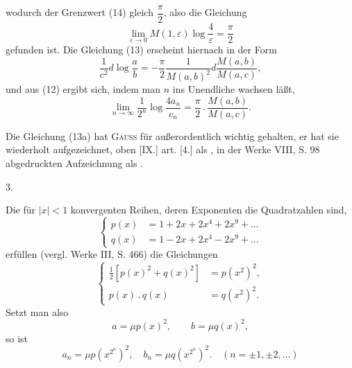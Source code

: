 \noindent wodurch der Grenzwert (14) gleich $\dfrac\pi2$, also die Gleichung
\begin{equation*}\tag*{(14a)}\lim_{\varepsilon\to0}M(1,\varepsilon)\log\frac4\varepsilon=\frac\pi2\end{equation*}
\noindent gefunden ist. Die Gleichung (13) erscheint hiernach in der Form
\begin{equation*}\tag*{(13a)}\frac1{c^2}d\log\frac ab=-\frac\pi2\frac1{M(a,b)^2}d\frac{M(a,b)}{M(a,c)},\end{equation*}
\noindent und aus (12) ergibt sich, indem man $n$ ins Unendliche wachsen läßt,
\begin{equation*}\tag*{(12a)}\lim_{n\to\infty}\frac1{2^n}\log\frac{4a_n}{c_n}=\frac\pi2\, .\,\frac{M(a,b)}{M(a,c)}.\end{equation*}
\par\indent Die Gleichung (13a) hat \textsc{Gauss} für außerordentlich wichtig gehalten, er hat sie wiederholt aufgezeichnet, oben [IX.] art. [4.] als , in der Werke VIII, S. 98 abgedruckten Aufzeichnung als .
\begin{center}3.\end{center}
\par\indent Die für $|x|<1$ konvergenten Reihen, deren Exponenten die Quadratzahlen sind,
\begin{equation*}\tag*{(28)}\left\{\begin{aligned}p(x)&=1+2x+2x^4+2x^9+\ldots\\q(x)&=1-2x+2x^4-2x^9+\ldots\end{aligned}\right.\end{equation*}
\noindent erfüllen (vergl. Werke III, S. 466) die Gleichungen
\begin{equation*}\tag*{(29)}\left\{\begin{aligned}\tfrac12[p(x)^2+q(x)^2]&=p(x^2)^2,\\p(x)\, .\,q(x)&=q(x^2)^2.\end{aligned}\right.\end{equation*}
\clearpage
{}
\noindent Setzt man also
\begin{equation*}\tag*{(30)}a=\mu p(x)^2,\qquad b=\mu q(x)^2,\end{equation*}
\noindent so ist
\begin{equation*}\tag*{(31)}a_n=\mu p(x^{2^n})^2,\quad b_n=\mu q(x^{2^n})^2.\quad(n=\pm1,\pm2,\ldots)\end{equation*}

